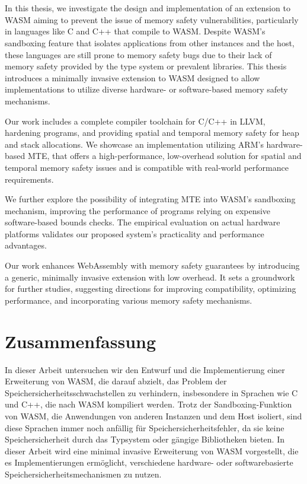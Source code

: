 \chapter{\abstractname}
\label{ch:abstract}

In this thesis, we investigate the design and implementation of an extension to \acf*{WASM} aiming to prevent the issue of memory safety vulnerabilities, particularly in languages like C and C++ that compile to \acs*{WASM}.
Despite \acs*{WASM}'s sandboxing feature that isolates applications from other instances and the host, these languages are still prone to memory safety bugs due to their lack of memory safety provided by the type system or prevalent libraries.
This thesis introduces a minimally invasive extension to \acs*{WASM} designed to allow implementations to utilize diverse hardware- or software-based memory safety mechanisms.

Our work includes a complete compiler toolchain for C/C++ in LLVM, hardening programs, and providing spatial and temporal memory safety for heap and stack allocations.
We showcase an implementation utilizing ARM's hardware-based \acf*{MTE}, that offers a high-performance, low-overhead solution for spatial and temporal memory safety issues and is compatible with real-world performance requirements.

We further explore the possibility of integrating \acs*{MTE} into \acs*{WASM}'s sandboxing mechanism, improving the performance of programs relying on expensive software-based bounds checks.
The empirical evaluation on actual hardware platforms validates our proposed system's practicality and performance advantages.

Our work enhances WebAssembly with memory safety guarantees by introducing a generic, minimally invasive extension with low overhead.
It sets a groundwork for further studies, suggesting directions for improving compatibility, optimizing performance, and incorporating various memory safety mechanisms.


\chapter{Zusammenfassung}
\label{ch:zusammenfassung}

In dieser Arbeit untersuchen wir den Entwurf und die Implementierung einer Erweiterung von \acf*{WASM}, die darauf abzielt, das Problem der Speichersicherheitsschwachstellen zu verhindern, insbesondere in Sprachen wie C und C++, die nach \acs*{WASM} kompiliert werden.
Trotz der Sandboxing-Funktion von \acs*{WASM}, die Anwendungen von anderen Instanzen und dem Host isoliert, sind diese Sprachen immer noch anfällig für Speichersicherheitsfehler, da sie keine Speichersicherheit durch das Typsystem oder gängige Bibliotheken bieten.
In dieser Arbeit wird eine minimal invasive Erweiterung von \acs*{WASM} vorgestellt, die es Implementierungen ermöglicht, verschiedene hardware- oder softwarebasierte Speichersicherheitsmechanismen zu nutzen.

